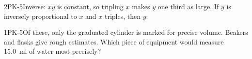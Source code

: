 \documentclass[11pt]{article}
\begin{document}
\begin{q}{2}{PK-5}{Inverse: $xy$ is constant, so tripling $x$ makes $y$ one third as large.}
If $y$ is inversely proportional to $x$ and $x$ triples, then $y$:
\end{q}

\begin{q}{1}{PK-5}{Of these, only the graduated cylinder is marked for precise volume. Beakers and flasks give rough estimates.}
Which piece of equipment would measure \SI{15.0}{\milli\litre} of water most precisely?
\end{q}

\makekey
\end{document}
